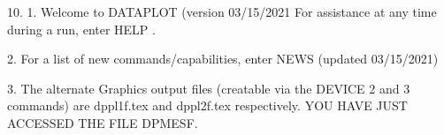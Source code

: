 10.
1. Welcome to DATAPLOT (version 03/15/2021  For assistance at
   any time during a run, enter HELP   .

2. For a list of new commands/capabilities,
   enter NEWS  (updated 03/15/2021)

3. The alternate Graphics output files (creatable
   via the DEVICE 2 and 3 commands) are
   dppl1f.tex and dppl2f.tex respectively.
YOU HAVE JUST ACCESSED THE FILE DPMESF.
